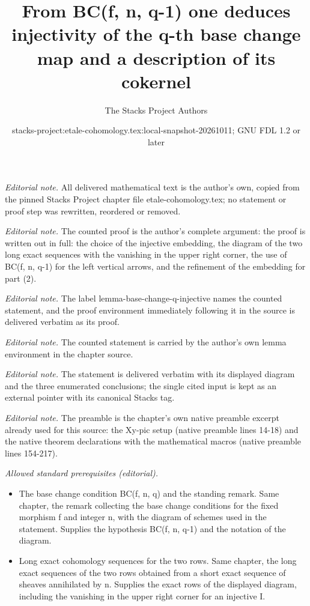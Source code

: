 \documentclass[10pt,a4paper]{amsart}
\title{From BC(f, n, q-1) one deduces injectivity of the q-th base change map and a description of its cokernel}
\author{The Stacks Project Authors}
\date{stacks-project:etale-cohomology.tex:local-snapshot-20261011; GNU FDL 1.2 or later}
\theoremstyle{plain}
\theoremstyle{definition}
\theoremstyle{remark}
\numberwithin{equation}{subsection}
\begin{document}
\maketitle
\noindent\textit{Editorial note.} All delivered mathematical text is the author's own, copied from the pinned Stacks Project chapter file etale-cohomology.tex; no statement or proof step was rewritten, reordered or removed.\par\medskip
\noindent\textit{Editorial note.} The counted proof is the author's complete argument: the proof is written out in full: the choice of the injective embedding, the diagram of the two long exact sequences with the vanishing in the upper right corner, the use of BC(f, n, q-1) for the left vertical arrows, and the refinement of the embedding for part (2).\par\medskip
\noindent\textit{Editorial note.} The label lemma-base-change-q-injective names the counted statement, and the proof environment immediately following it in the source is delivered verbatim as its proof.\par\medskip
\noindent\textit{Editorial note.} The counted statement is carried by the author's own lemma environment in the chapter source.\par\medskip
\noindent\textit{Editorial note.} The statement is delivered verbatim with its displayed diagram and the three enumerated conclusions; the single cited input is kept as an external pointer with its canonical Stacks tag.\par\medskip
\noindent\textit{Editorial note.} The preamble is the chapter's own native preamble excerpt already used for this source: the Xy-pic setup (native preamble lines 14-18) and the native theorem declarations with the mathematical macros (native preamble lines 154-217).\par\medskip
\noindent\textit{Allowed standard prerequisites (editorial).}\begin{itemize}
\item The base change condition BC(f, n, q) and the standing remark. Same chapter, the remark collecting the base change conditions for the fixed morphism f and integer n, with the diagram of schemes used in the statement. Supplies the hypothesis BC(f, n, q-1) and the notation of the diagram.
\item Long exact cohomology sequences for the two rows. Same chapter, the long exact sequences of the two rows obtained from a short exact sequence of sheaves annihilated by n. Supplies the exact rows of the displayed diagram, including the vanishing in the upper right corner for an injective I.
\end{itemize}\medskip
\end{document}
